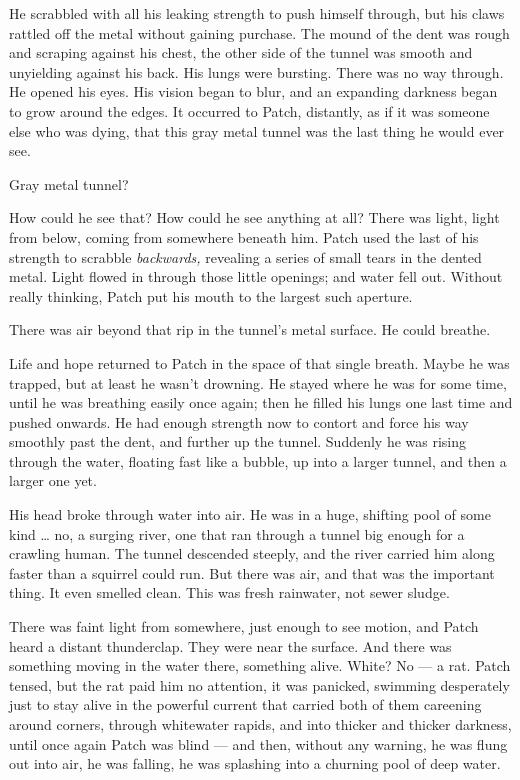 \documentclass[12pt]{book}
\begin{document}
He scrabbled with all his leaking strength to push himself through,
but his claws rattled off the metal without gaining purchase. The
mound of the dent was rough and scraping against his chest, the other
side of the tunnel was smooth and unyielding against his back. His
lungs were bursting. There was no way through. He opened his eyes. His
vision began to blur, and an expanding darkness began to grow around
the edges. It occurred to Patch, distantly, as if it was someone else
who was dying, that this gray metal tunnel was the last thing he would
ever see.

Gray metal tunnel?

How could he see that? How could he see anything at all? There was
light, light from below, coming from somewhere beneath him. Patch used
the last of his strength to scrabble \textit{backwards,} revealing a
series of small tears in the dented metal. Light flowed in through
those little openings; and water fell out. Without really thinking,
Patch put his mouth to the largest such aperture.

There was air beyond that rip in the tunnel's metal surface. He could
breathe.

Life and hope returned to Patch in the space of that single
breath. Maybe he was trapped, but at least he wasn't drowning. He
stayed where he was for some time, until he was breathing easily once
again; then he filled his lungs one last time and pushed onwards. He
had enough strength now to contort and force his way smoothly past the
dent, and further up the tunnel. Suddenly he was rising through the
water, floating fast like a bubble, up into a larger tunnel, and then
a larger one yet.

His head broke through water into air. He was in a huge, shifting pool
of some kind \ldots{} no, a surging river, one that ran through a
tunnel big enough for a crawling human. The tunnel descended steeply,
and the river carried him along faster than a squirrel could run. But
there was air, and that was the important thing. It even smelled
clean. This was fresh rainwater, not sewer sludge.

There was faint light from somewhere, just enough to see motion, and
Patch heard a distant thunderclap. They were near the surface. And
there was something moving in the water there, something alive. White?
No --- a rat. Patch tensed, but the rat paid him no attention, it was
panicked, swimming desperately just to stay alive in the powerful
current that carried both of them careening around corners, through
whitewater rapids, and into thicker and thicker darkness, until once
again Patch was blind --- and then, without any warning, he was flung
out into air, he was falling, he was splashing into a churning pool of
deep water.
\end{document}
